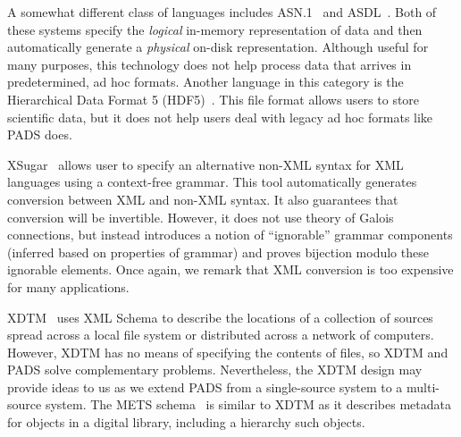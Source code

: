 \documentclass[10pt]{article}
\begin{document}

A somewhat different class of languages includes
\textsc{ASN.1}~\cite{asn} and \textsc{ASDL}~\cite{asdl}.  Both of
these systems specify the {\em logical\/} in-memory representation of
data and then automatically generate a {\em physical\/} on-disk
representation.  Although useful for many purposes, this technology
does not help process data that arrives in predetermined, ad hoc
formats.  Another language in this category is the Hierarchical Data
Format 5 (HDF5)~\cite{hdf5}.  This file format allows users to store
scientific data, but it does not help users deal with legacy ad hoc
formats like PADS does.


XSugar~\cite{brabrand+:xsugar2005} allows user to specify an
alternative non-XML syntax for XML languages using a context-free
grammar.  This tool automatically generates conversion between XML and
non-XML syntax. It also guarantees that conversion will be invertible.
However, it does not use theory of Galois connections, but instead
introduces a notion of ``ignorable'' grammar components (inferred
based on properties of grammar) and proves bijection modulo these
ignorable elements.  Once again, we remark that XML conversion is
too expensive for many applications.

XDTM~\cite{zhao+:sigmod05,xdtm} uses XML Schema to describe the
locations of a collection of sources spread across a local file system
or distributed across a network of computers.  However, XDTM has no
means of specifying the contents of files, so XDTM and PADS solve
complementary problems.  Nevertheless, the XDTM design may provide
ideas to us as we extend PADS from a single-source system to a
multi-source system. The METS schema~\cite{mets} is similar to XDTM as
it describes metadata for objects in a digital library, including a
hierarchy such objects.
\end{document}
